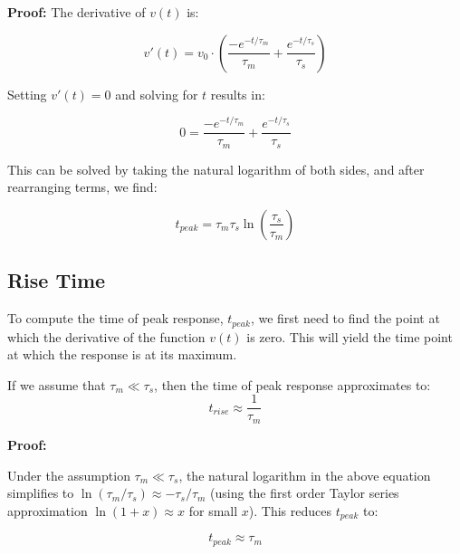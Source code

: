 \textbf{Proof:}
The derivative of $v(t)$ is:

\begin{equation}
v'(t) = v_0 \cdot \left(\frac{-e^{-t/\tau_m}}{\tau_m} + \frac{e^{-t/\tau_s}}{\tau_s}\right)
\end{equation}

Setting $v'(t) = 0$ and solving for $t$ results in:

\begin{equation}
0 = \frac{-e^{-t/\tau_m}}{\tau_m} + \frac{e^{-t/\tau_s}}{\tau_s}
\end{equation}

This can be solved by taking the natural logarithm of both sides, and after rearranging terms, we find:

\begin{equation}
t_{peak} = \tau_m \tau_s \ln\left(\frac{\tau_s}{\tau_m}\right)
\end{equation}


\subsection{Rise Time}

To compute the time of peak response, $t_{peak}$, we first need to find the point at which the derivative of the function $v(t)$ is zero. This will yield the time point at which the response is at its maximum.

\begin{mdframed}[backgroundcolor=red_background, linecolor=black, linewidth=2pt, frametitle=\textbf{Statement}]
\begin{center}

    \label{st:rise-time}
    If we assume that $\tau_m \ll \tau_s$, then the time of peak response approximates to:
    \begin{equation}
        t_{rise} \approx \frac{1}{\tau_m}
    \end{equation}

\end{center}
\end{mdframed}

\textbf{Proof:}

Under the assumption $\tau_m \ll \tau_s$, the natural logarithm in the above equation simplifies to $\ln(\tau_m/\tau_s) \approx -\tau_s/\tau_m$ (using the first order Taylor series approximation $\ln(1+x) \approx x$ for small $x$). This reduces $t_{peak}$ to:

\begin{equation}
t_{peak} \approx \tau_m
\end{equation}

